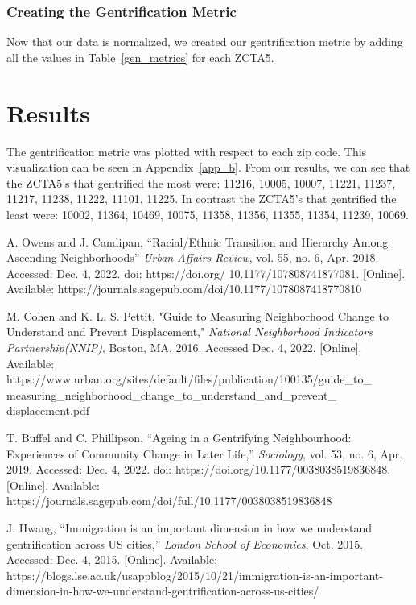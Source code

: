 \documentclass[conference]{IEEEtran}
\begin{document}
\subsubsection{Creating the Gentrification Metric}
Now that our data is normalized, we created our gentrification metric by adding all the values in Table~\ref{gen_metrics} for each ZCTA5.

\section{Results}
The gentrification metric was plotted with respect to each zip code. This visualization can be seen in Appendix~\ref{app_b}. From our results, we can see that the ZCTA5's that gentrified the most were: 11216, 10005, 10007, 11221, 11237, 11217, 11238, 11222, 11101, 11225. In contrast the ZCTA5's that gentrified the least were: 10002, 11364, 10469, 10075, 11358, 11356, 11355, 11354, 11239, 10069.

\begin{thebibliography}{00}
 A. Owens and J. Candipan, ``Racial/Ethnic Transition and Hierarchy Among Ascending Neighborhoods'' \textit{Urban Affairs Review}, vol. 55, no. 6, Apr. 2018. Accessed: Dec. 4, 2022. doi: https://doi.org/ 10.1177/107808741877081. [Online]. Available: https://journals.sagepub.com/doi/10.1177/1078087418770810

 M. Cohen and K. L. S. Pettit, "Guide to Measuring Neighborhood Change to Understand and Prevent Displacement," \textit{National Neighborhood Indicators Partnership(NNIP)}, Boston, MA, 2016. Accessed Dec. 4, 2022. [Online]. Available: https://www.urban.org/sites/default/files/publication/100135/guide\_to\_ measuring\_neighborhood\_change\_to\_understand\_and\_prevent\_ displacement.pdf

 T. Buffel and C. Phillipson, “Ageing in a Gentrifying Neighbourhood: Experiences of Community Change in Later Life,” \textit{Sociology}, vol. 53, no. 6, Apr. 2019. Accessed: Dec. 4, 2022. doi: https://doi.org/10.1177/0038038519836848. [Online]. Available: https://journals.sagepub.com/doi/full/10.1177/0038038519836848

 J. Hwang, “Immigration is an important dimension in how we understand gentrification across US cities,” \textit{London School of Economics}, Oct. 2015. Accessed: Dec. 4, 2015. [Online]. Available: https://blogs.lse.ac.uk/usappblog/2015/10/21/immigration-is-an-important-dimension-in-how-we-understand-gentrification-across-us-cities/ 


\end{thebibliography}
\end{document}
